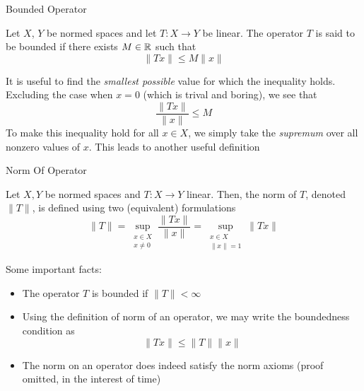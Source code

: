 \documentclass[10pt]{beamer}
\begin{document}
		\begin{frame}{Bounded Operator}
				\begin{definition}
						Let $X$, $Y$ be normed spaces and let $T: X\to Y$ be linear. The operator $T$ is said to be \alert{bounded} if there exists $M\in\mathbb{R}$ such that 
						\begin{equation*}
								\|Tx\| \leq M\|x\|
						\end{equation*}
				\end{definition}

				It is useful to find the \emph{smallest possible} value for which the inequality holds. Excluding the case when $x = 0$ (which is trival and boring), we see that 
				\begin{equation*}
						\frac{\|Tx\|}{\|x\|} \leq M
				\end{equation*}
				To make this inequality hold for all $x\in X$, we simply take the \emph{supremum} over all nonzero values of $x$. This leads to another useful definition 
		\end{frame}

		\begin{frame}{Norm Of Operator}
				\begin{definition}
						Let $X,Y$ be normed spaces and $T: X\to Y$ linear. Then, the \alert{norm} of $T$, denoted $\|T\|$, is defined using two (equivalent) formulations 
						\begin{equation*}
								\|T\| = \sup_{\substack{x\in X \\ x \neq 0}} \frac{\|Tx\|}{\|x\|} = \sup_{\substack{x\in X \\ \|x\| = 1}} \|Tx\|
						\end{equation*}
				\end{definition}
				Some important facts: 
				\begin{itemize}
						\item<2-> The operator $T$ is bounded if $\|T\| < \infty$ 
						\item<3-> Using the definition of norm of an operator, we may write the boundedness condition as 
								\begin{equation*}
										\|Tx\| \leq \|T\|\|x\|
								\end{equation*}
						\item<4-> The norm on an operator does indeed satisfy the norm axioms (proof omitted, in the interest of time)
				\end{itemize}
		\end{frame}
\end{document}
